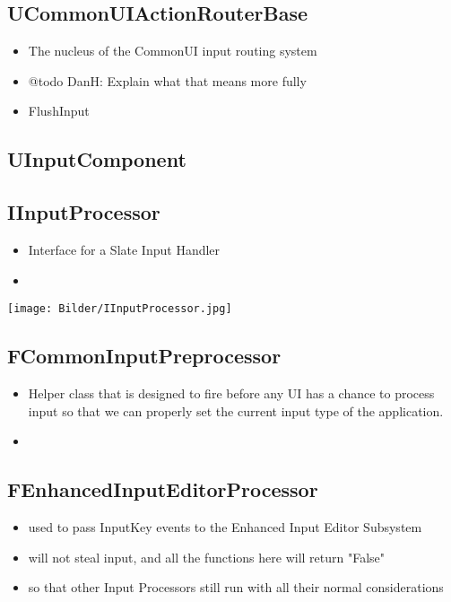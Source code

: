         \subsection{UCommonUIActionRouterBase}
            \begin{itemize}
                \item The nucleus of the CommonUI input routing system
                \item @todo DanH: Explain what that means more fully 
                \item FlushInput
            \end{itemize}

        \subsection{UInputComponent}

        \subsection{IInputProcessor}
            \begin{itemize}
                \item Interface for a Slate Input Handler
                \item 
            \end{itemize}
             \texttt{[image: Bilder/IInputProcessor.jpg]}

        \subsection{FCommonInputPreprocessor}
            \begin{itemize}
                \item Helper class that is designed to fire before any UI has a chance to process input so that we can properly set the current input type of the application.
                \item 
            \end{itemize}

        \subsection{FEnhancedInputEditorProcessor}
            \begin{itemize}
                \item used to pass InputKey events to the Enhanced Input Editor Subsystem
                \item will not steal input, and all the functions here will return "False"
                \item so that other Input Processors still run with all their normal considerations
            \end{itemize}

